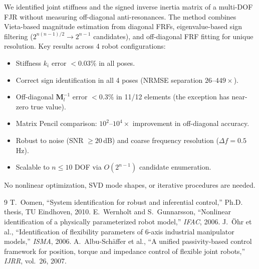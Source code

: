 \documentclass[10pt,twocolumn]{article}
\begin{document}
We identified joint stiffness and the signed inverse inertia matrix of a multi-DOF FJR without measuring off-diagonal anti-resonances. The method combines Vieta-based magnitude estimation from diagonal FRFs, eigenvalue-based sign filtering ($2^{n(n-1)/2} \to 2^{n-1}$ candidates), and off-diagonal FRF fitting for unique resolution. Key results across 4 robot configurations:

\begin{itemize}
\item Stiffness $k_i$ error $<0.03\%$ in all poses.
\item Correct sign identification in all 4 poses (NRMSE separation $26$--$449\times$).
\item Off-diagonal $\bm{M}_l^{-1}$ error $<0.3\%$ in 11/12 elements (the exception has near-zero true value).
\item Matrix Pencil comparison: $10^2$--$10^4\times$ improvement in off-diagonal accuracy.
\item Robust to noise (SNR $\geq 20$\,dB) and coarse frequency resolution ($\Delta f = 0.5$\,Hz).
\item Scalable to $n \leq 10$ DOF via $O(2^{n-1})$ candidate enumeration.
\end{itemize}

No nonlinear optimization, SVD mode shapes, or iterative procedures are needed.


\begin{thebibliography}{9}
 T.~Oomen, ``System identification for robust and inferential control,'' Ph.D. thesis, TU Eindhoven, 2010.
 E.~Wernholt and S.~Gunnarsson, ``Nonlinear identification of a physically parameterized robot model,'' \emph{IFAC}, 2006.
 J.~\"Ohr et al., ``Identification of flexibility parameters of 6-axis industrial manipulator models,'' \emph{ISMA}, 2006.
 A.~Albu-Sch\"affer et al., ``A unified passivity-based control framework for position, torque and impedance control of flexible joint robots,'' \emph{IJRR}, vol.~26, 2007.
\end{thebibliography}
\end{document}
